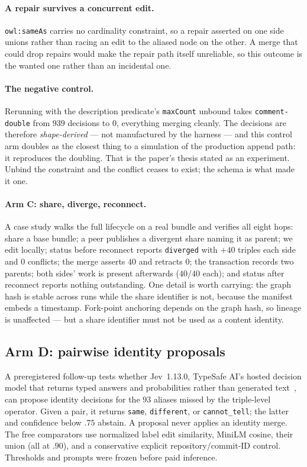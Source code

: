 \paragraph{A repair survives a concurrent edit.} \texttt{owl:sameAs} carries no
cardinality constraint, so a repair asserted on one side unions rather than
racing an edit to the aliased node on the other. A merge that could drop repairs
would make the repair path itself unreliable, so this outcome is the wanted one
rather than an incidental one.

\paragraph{The negative control.} Rerunning with the description predicate's
\texttt{maxCount} unbound takes \texttt{comment-double} from $939$ decisions to
$0$, everything merging cleanly. The decisions are therefore \emph{shape-derived}
--- not manufactured by the harness --- and this control arm doubles as the
closest thing to a simulation of the production append path: it reproduces the
doubling. That is the paper's thesis stated as an experiment. Unbind the
constraint and the conflict ceases to exist; the schema is what made it one.

\paragraph{Arm C: share, diverge, reconnect.} A case study walks the full
lifecycle on a real bundle and verifies all eight hops: share a base bundle;
a peer publishes a divergent share naming it as parent; we edit locally; status
before reconnect reports \texttt{diverged} with $+40$ triples each side and $0$
conflicts; the merge asserts $40$ and retracts $0$; the transaction records two
parents; both sides' work is present afterwards ($40/40$ each); and status after
reconnect reports nothing outstanding. One detail is worth carrying: the graph
hash is stable across runs while the share identifier is not, because the
manifest embeds a timestamp. Fork-point anchoring depends on the graph hash, so
lineage is unaffected --- but a share identifier must not be used as a content
identity.

\subsection{Arm D: pairwise identity proposals}
\label{sec:armD}
A preregistered follow-up tests whether Jev~1.13.0, TypeSafe AI's hosted
decision model that returns typed answers and probabilities rather than
generated text~\cite{typesafe2026jev}, can propose identity decisions for the
$93$ aliases missed by the triple-level operator. Given a pair, it
returns \texttt{same}, \texttt{different}, or \texttt{cannot\_tell}; the latter
and confidence below $.75$ abstain. A proposal never applies an identity merge.
The free comparators use normalized label edit similarity, MiniLM cosine, their
union (all at $.90$), and a conservative explicit repository/commit-ID control.
Thresholds and prompts were frozen before paid inference.

